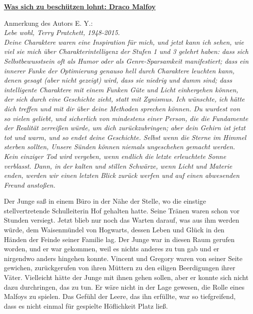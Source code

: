 

\hypertarget{was-sich-zu-beschuxfctzen-lohnt-draco-malfoy}{%

\textbf{\uline{Was sich zu beschützen lohnt: Draco Malfoy}}

\hfill\break Anmerkung des Autors E. Y.:\\ \emph{Lebe wohl, Terry Pratchett, 1948-2015.}\\ \emph{Deine Charaktere waren eine Inspiration für mich, und jetzt kann ich sehen, wie viel sie mich über Charakterintelligenz der Stufen 1 und 3 gelehrt haben: dass sich Selbstbewusstsein oft als Humor oder als Genre-Sparsamkeit manifestiert; dass ein innerer Funke der Optimierung genauso hell durch Charaktere leuchten kann, denen gesagt (aber nicht gezeigt) wird, dass sie niedrig und dumm sind; dass intelligente Charaktere mit einem Funken Güte und Licht einhergehen können, der sich durch eine Geschichte zieht, statt mit Zynismus. Ich wünschte, ich hätte dich treffen und mit dir über deine Methoden sprechen können. Du wurdest von so vielen geliebt, und sicherlich von mindestens einer Person, die die Fundamente der Realität zerreißen würde, um dich zurückzubringen; aber dein Gehirn ist jetzt tot und warm, und so endet deine Geschichte. Selbst wenn die Sterne im Himmel sterben sollten, Unsere Sünden können niemals ungeschehen gemacht werden. Kein einziger Tod wird vergeben, wenn endlich die letzte erleuchtete Sonne verblasst. Dann, in der kalten und stillen Schwärze, wenn Licht und Materie enden, werden wir einen letzten Blick zurück werfen und auf einen abwesenden Freund anstoßen.}

Der Junge saß in einem Büro in der Nähe der Stelle, wo die einstige stellvertretende Schulleiterin Hof gehalten hatte. Seine Tränen waren schon vor Stunden versiegt. Jetzt blieb nur noch das Warten darauf, was aus ihm werden würde, dem Waisenmündel von Hogwarts, dessen Leben und Glück in den Händen der Feinde seiner Familie lag. Der Junge war in diesen Raum gerufen worden, und er war gekommen, weil es nichts anderes zu tun gab und er nirgendwo anders hingehen konnte. Vincent und Gregory waren von seiner Seite gewichen, zurückgerufen von ihren Müttern zu den eiligen Beerdigungen ihrer Väter. Vielleicht hätte der Junge mit ihnen gehen sollen, aber er konnte sich nicht dazu durchringen, das zu tun. Er wäre nicht in der Lage gewesen, die Rolle eines Malfoys zu spielen. Das Gefühl der Leere, das ihn erfüllte, war so tiefgreifend, dass es nicht einmal für gespielte Höflichkeit Platz ließ.

}
